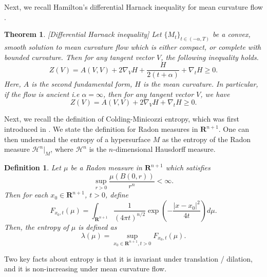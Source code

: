 \documentclass[pdflatex,sn-mathphys-num]{sn-jnl}%
\newtheorem{theorem}{Theorem}[section]
\newtheorem{definition}{Definition}[section]
\begin{document}
Next, we recall Hamilton's differential Harnack inequality for mean curvature flow \cite{Hamilton1995HarnackEF}. 
\begin{theorem}\label{Hamilton's Harnack inequality}[Differential Harnack inequality]
    Let $\{M_t\}_{t \in (-\alpha, T)}$ be a convex, smooth solution to mean curvature flow which is either compact, or complete with bounded curvature. Then for any tangent vector $V$, the following inequality holds. 
    \begin{equation}
        Z(V) = A(V,V) + 2\nabla_VH + \frac{H}{2(t+\alpha)} + \nabla_tH \geq 0.
    \end{equation}
    Here, $A$ is the second fundamental form, $H$ is the mean curvature. In particular, if the flow is ancient i.e $\alpha = \infty$, then for any tangent vector $V$, we have
    \begin{equation}\label{ancient harnack inequality}
        Z(V) = A(V,V) + 2\nabla_VH + \nabla_tH \geq 0.
    \end{equation}
\end{theorem}
Next, we recall the definition of Colding-Minicozzi entropy, which was first introduced in \cite{coldingminicozzi}. We state the definition for Radon measures in $\mathbf{R}^{n+1}$. One can then understand the entropy of a hypersurface $M$ as the entropy of the Radon measure $\mathcal{H}^n|_{M}$, where $\mathcal{H}^n$ is the $n$-dimensional Hausdorff measure.
\begin{definition}\label{colding minicozzi definition}
    Let $\mu$ be a Radon measure in $\mathbf{R}^{n+1}$ which satisfies 
    \begin{equation}
        \sup_{r > 0}\frac{\mu(B(0, r))}{r^n} < \infty.
    \end{equation}
    Then for each $x_0 \in \mathbf{R}^{n+1}$, $t > 0$, define
    \begin{equation}
        F_{x_0, t}(\mu) = \int_{\mathbf{R}^{n+1}}\frac{1}{(4\pi t)^{n/2}}\exp{(-\frac{|x - x_0|^2}{4t})}d\mu.
    \end{equation}
    Then, the entropy of $\mu$ is defined as
    \begin{equation}
        \lambda(\mu) = \sup_{x_0 \in \mathbf{R}^{n+1}, t > 0}F_{x_0, t}(\mu).
    \end{equation}
\end{definition}
Two key facts about entropy is that it is invariant under translation / dilation, and it is non-increasing under mean curvature flow. \\
\end{document}
